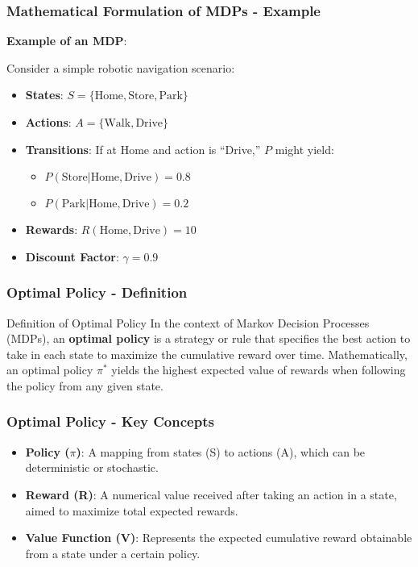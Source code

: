 \documentclass[aspectratio=169]{beamer}
\begin{document}
\begin{frame}[fragile]
    \frametitle{Mathematical Formulation of MDPs - Example}
    \textbf{Example of an MDP}:
    
    Consider a simple robotic navigation scenario:
    
    \begin{itemize}
        \item \textbf{States}: \( S = \{ \text{Home}, \text{Store}, \text{Park} \} \)
        
        \item \textbf{Actions}: \( A = \{ \text{Walk}, \text{Drive} \} \)

        \item \textbf{Transitions}: If at Home and action is “Drive,” \( P \) might yield:
        \begin{itemize}
            \item \( P(\text{Store} | \text{Home}, \text{Drive}) = 0.8 \)
            \item \( P(\text{Park} | \text{Home}, \text{Drive}) = 0.2 \)
        \end{itemize}

        \item \textbf{Rewards}: \( R(\text{Home}, \text{Drive}) = 10 \)

        \item \textbf{Discount Factor}: \( \gamma = 0.9 \)
    \end{itemize}
\end{frame}

\begin{frame}[fragile]
    \frametitle{Optimal Policy - Definition}
    \begin{block}{Definition of Optimal Policy}
        In the context of Markov Decision Processes (MDPs), an \textbf{optimal policy} is a strategy or rule that specifies the best action to take in each state to maximize the cumulative reward over time. 
        Mathematically, an optimal policy $\pi^*$ yields the highest expected value of rewards when following the policy from any given state.
    \end{block}
\end{frame}

\begin{frame}[fragile]
    \frametitle{Optimal Policy - Key Concepts}
    \begin{itemize}
        \item \textbf{Policy ($\pi$)}: A mapping from states (S) to actions (A), which can be deterministic or stochastic.
        \item \textbf{Reward (R)}: A numerical value received after taking an action in a state, aimed to maximize total expected rewards.
        \item \textbf{Value Function (V)}: Represents the expected cumulative reward obtainable from a state under a certain policy.
    \end{itemize}
\end{frame}
\end{document}
